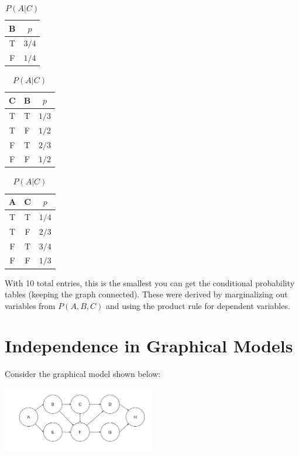 \documentclass[fleqn]{hw}
\begin{document}
\begin{table}[H]
        \begin{minipage}{0.333\textwidth}
            \centering
            \begin{tabular}{|c|c|}
\hline
{\bf B} & $p$ \\
\hline
T & $3/4$ \\
F & $1/4$ \\
\hline
\end{tabular}
\caption{$P(B)$}
        \end{minipage}
        \begin{minipage}{0.3333\textwidth}
            \centering
      \begin{tabular}{|cc|c|}
\hline
{\bf C} & {\bf B} & $p$ \\
\hline
T & T & $1/3$ \\
T & F & $1/2$ \\
F & T & $2/3$ \\
F & F & $1/2$ \\
\hline
\end{tabular}
\caption{$P(C | B)$}
        \end{minipage}
        \begin{minipage}{0.333\textwidth}
            \centering
\begin{tabular}{|cc|c|}
\hline
{\bf A} & {\bf C} & $p$ \\
\hline
T & T & $1/4$ \\
T & F & $2/3$ \\
F & T & $3/4$ \\
F & F & $1/3$ \\
\hline
\end{tabular}
\caption{$P(A | C)$}
        \end{minipage}
    \end{table}
    
With 10 total entries, this is the smallest you can get the conditional probability tables (keeping the graph connected). These were derived by marginalizing out variables from $P(A, B, C)$ and using the product rule for dependent variables.

\newpage
\section{Independence in Graphical Models}

Consider the graphical model shown below:

\includegraphics[width=0.5\textwidth]{example-network}
\end{document}
